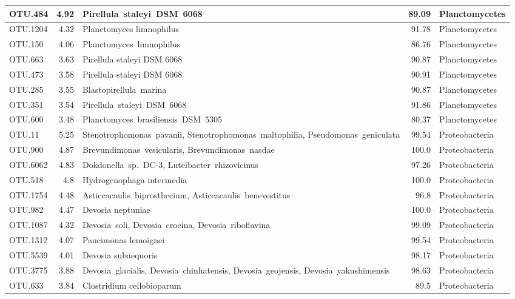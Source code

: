\begin{longtable}{lrp{6.5cm}rl}
OTU.484 & 4.92 & \mbox{Pirellula staleyi DSM 6068} & 89.09 & Planctomycetes \\ \midrule
OTU.1204 & 4.32 & Planctomyces limnophilus & 91.78 & Planctomycetes \\ \midrule
OTU.150 & 4.06 & \mbox{Planctomyces limnophilus} & 86.76 & Planctomycetes \\ \midrule
OTU.663 & 3.63 & Pirellula staleyi DSM 6068 & 90.87 & Planctomycetes \\ \midrule
OTU.473 & 3.58 & Pirellula staleyi DSM 6068 & 90.91 & Planctomycetes \\ \midrule
OTU.285 & 3.55 & \mbox{Blastopirellula marina} & 90.87 & Planctomycetes \\ \midrule
OTU.351 & 3.54 & \mbox{Pirellula staleyi DSM 6068} & 91.86 & Planctomycetes \\ \midrule
OTU.600 & 3.48 & \mbox{Planctomyces brasiliensis DSM 5305} & 80.37 & Planctomycetes \\ \midrule
OTU.11 & 5.25 & \mbox{Stenotrophomonas pavanii}, \mbox{Stenotrophomonas maltophilia}, \mbox{Pseudomonas geniculata} & 99.54 & Proteobacteria \\ \midrule
OTU.900 & 4.87 & \mbox{Brevundimonas vesicularis}, \mbox{Brevundimonas nasdae} & 100.0 & Proteobacteria \\ \midrule
OTU.6062 & 4.83 & \mbox{Dokdonella sp. DC-3}, \mbox{Luteibacter rhizovicinus} & 97.26 & Proteobacteria \\ \midrule
OTU.518 & 4.8 & Hydrogenophaga intermedia & 100.0 & Proteobacteria \\ \midrule
OTU.1754 & 4.48 & \mbox{Asticcacaulis biprosthecium}, \mbox{Asticcacaulis benevestitus} & 96.8 & Proteobacteria \\ \midrule
OTU.982 & 4.47 & Devosia neptuniae & 100.0 & Proteobacteria \\ \midrule
OTU.1087 & 4.32 & \mbox{Devosia soli}, \mbox{Devosia crocina}, \mbox{Devosia riboflavina} & 99.09 & Proteobacteria \\ \midrule
OTU.1312 & 4.07 & Paucimonas lemoignei & 99.54 & Proteobacteria \\ \midrule
OTU.5539 & 4.01 & Devosia subaequoris & 98.17 & Proteobacteria \\ \midrule
OTU.3775 & 3.88 & \mbox{Devosia glacialis}, \mbox{Devosia chinhatensis}, \mbox{Devosia geojensis}, \mbox{Devosia yakushimensis} & 98.63 & Proteobacteria \\ \midrule
OTU.633 & 3.84 & Clostridium cellobioparum & 89.5 & Proteobacteria \\ \midrule

\end{longtable}
